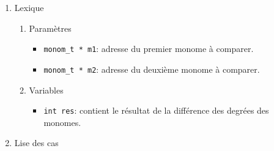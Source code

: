 \documentclass[11pt]{article}
\begin{document}
\begin{enumerate}
\item Lexique
\label{sec:org9e1afde}
\begin{enumerate}
\item Paramètres
\label{sec:org7af7f8d}
\begin{itemize}
\item \texttt{monom\_t * m1}: adresse du premier monome à comparer.
\item \texttt{monom\_t * m2}: adresse du deuxième monome à comparer.
\end{itemize}
\item Variables
\label{sec:orgb7b7ae4}
\begin{itemize}
\item \texttt{int res}: contient le résultat de la différence des degrées des monomes.
\end{itemize}
\end{enumerate}
\item Lise des cas
\label{sec:org6f1c33c}
\end{enumerate}
\end{document}
